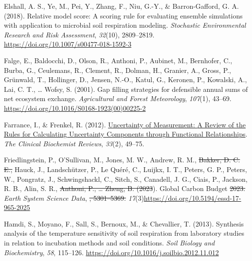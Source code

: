 \documentclass[
  letterpaper,
  DIV=11,
  numbers=noendperiod]{scrartcl}
\newlength{\cslhangindent}
\newenvironment{CSLReferences}[2] %
 {\begin{list}{}{%
  \setlength{\itemindent}{0pt}
  \setlength{\leftmargin}{0pt}
  \setlength{\parsep}{0pt}
  \ifodd #1
   \setlength{\leftmargin}{\cslhangindent}
   \setlength{\itemindent}{-1\cslhangindent}
  \fi
  \setlength{\itemsep}{#2\baselineskip}}}
 {\end{list}}
\providecommand{\DIFadd}[1]{{\protect\color{blue}\uwave{#1}}} %
\providecommand{\DIFdel}[1]{{\protect\color{red}\sout{#1}}}                      %
\providecommand{\DIFaddbegin}{} %
\providecommand{\DIFaddend}{} %
\providecommand{\DIFdelbegin}{} %
\providecommand{\DIFdelend}{} %
\newcommand{\DIFscaledelfig}{0.5}
\newlength{\DIFdelgraphicswidth} %
\newlength{\DIFdelgraphicsheight} %
\newcommand{\DIFaddincludegraphics}[2][]{{\color{blue}\fbox{\DIFOincludegraphics[#1]{#2}}}} %
\newcommand{\DIFdelincludegraphics}[2][]{%
\sbox{\DIFdelgraphicsbox}{\DIFOincludegraphics[#1]{#2}}%
\settoboxwidth{\DIFdelgraphicswidth}{\DIFdelgraphicsbox} %
\settoboxtotalheight{\DIFdelgraphicsheight}{\DIFdelgraphicsbox} %
\scalebox{\DIFscaledelfig}{%
\parbox[b]{\DIFdelgraphicswidth}{\usebox{\DIFdelgraphicsbox}\\[-\baselineskip] \rule{\DIFdelgraphicswidth}{0em}}\llap{\resizebox{\DIFdelgraphicswidth}{\DIFdelgraphicsheight}{%
\setlength{\unitlength}{\DIFdelgraphicswidth}%
\begin{picture}(1,1)%
\thicklines\linethickness{2pt} %
{\color[rgb]{1,0,0}\put(0,0){\framebox(1,1){}}}%
{\color[rgb]{1,0,0}\put(0,0){\line( 1,1){1}}}%
{\color[rgb]{1,0,0}\put(0,1){\line(1,-1){1}}}%
\end{picture}%
}\hspace*{3pt}}} %
} %
\DeclareRobustCommand{\DIFaddbegin}{\DIFOaddbegin \let\includegraphics\DIFaddincludegraphics} %
\DeclareRobustCommand{\DIFaddend}{\DIFOaddend \let\includegraphics\DIFOincludegraphics} %
\DeclareRobustCommand{\DIFdelbegin}{\DIFOdelbegin \let\includegraphics\DIFdelincludegraphics} %
\DeclareRobustCommand{\DIFdelend}{\DIFOaddend \let\includegraphics\DIFOincludegraphics} %
\begin{document}
\begin{CSLReferences}{1}{0}
\DIFaddend {}
Elshall, A. S., Ye, M., Pei, Y., Zhang, F., Niu, G.-Y., \&
Barron-Gafford, G. A. (2018). Relative model score: A scoring rule for
evaluating ensemble simulations with application to microbial soil
respiration modeling. \emph{Stochastic Environmental Research and Risk
Assessment}, \emph{32}(10), 2809--2819.
\url{https://doi.org/10.1007/s00477-018-1592-3}

Falge, E., Baldocchi, D., Olson, R., Anthoni, P., Aubinet, M.,
Bernhofer, C., Burba, G., Ceulemans, R., Clement, R., Dolman, H.,
Granier, A., Gross, P., Grünwald, T., Hollinger, D., Jensen, N.-O.,
Katul, G., Keronen, P., Kowalski, A., Lai, C. T., \ldots{} Wofsy, S.
(2001). Gap filling strategies for defensible annual sums of net
ecosystem exchange. \emph{Agricultural and Forest Meteorology},
\emph{107}(1), 43--69.
\url{https://doi.org/10.1016/S0168-1923(00)00225-2}

Farrance, I., \& Frenkel, R. (2012).
\href{https://www.ncbi.nlm.nih.gov/pmc/articles/PMC3387884}{Uncertainty
of {Measurement}: {A Review} of the {Rules} for {Calculating Uncertainty
Components} through {Functional Relationships}}. \emph{The Clinical
Biochemist Reviews}, \emph{33}(2), 49--75.

\DIFdelbegin {}
\DIFdelend \DIFaddbegin {}
\DIFaddend Friedlingstein, P., O'Sullivan, M., Jones, M. W., Andrew, R. M., \DIFdelbegin \DIFdel{Bakker,
D. C. E., }\DIFdelend Hauck,
J., Landschützer, P., Le Quéré, C., \DIFaddbegin \DIFadd{Li, H., }\DIFaddend Luijkx, I. T., \DIFaddbegin \DIFadd{Olsen, A.,
}\DIFaddend Peters, G. P., Peters, W., Pongratz, J., Schwingshackl, C., Sitch, S.,
Canadell, J. G., Ciais, P., Jackson, R. B., Alin, S. R., \DIFdelbegin \DIFdel{Anthoni, P.,
\ldots{} Zheng,
B. (2023}\DIFdelend \DIFaddbegin \DIFadd{\ldots{} Zeng,
J. (2025}\DIFaddend ). Global {Carbon Budget} \DIFdelbegin \DIFdel{2023. }\DIFdelend \DIFaddbegin \DIFadd{2024. }\DIFaddend \emph{Earth System Science
Data}, \DIFdelbegin %
\DIFdel{, 5301--5369.
}%
\DIFdelend \DIFaddbegin \emph{17}(3)\DIFadd{, 965--1039.
}\url{https://doi.org/10.5194/essd-17-965-2025}
\DIFaddend 

Hamdi, S., Moyano, F., Sall, S., Bernoux, M., \& Chevallier, T. (2013).
Synthesis analysis of the temperature sensitivity of soil respiration
from laboratory studies in relation to incubation methods and soil
conditions. \emph{Soil Biology and Biochemistry}, \emph{58}, 115--126.
\url{https://doi.org/10.1016/j.soilbio.2012.11.012}


\end{CSLReferences}
\end{document}
